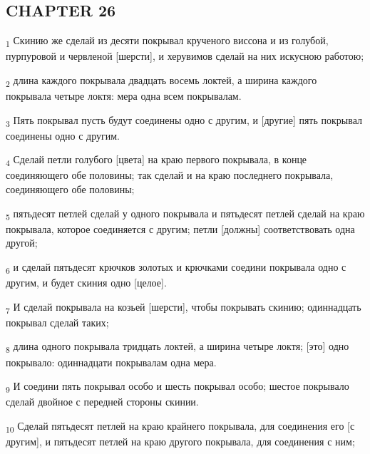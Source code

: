 \subsection{CHAPTER 26}
\begin{tcolorbox}
\textsubscript{1} Скинию же сделай из десяти покрывал крученого виссона и из голубой, пурпуровой и червленой [шерсти], и херувимов сделай на них искусною работою;
\end{tcolorbox}
\begin{tcolorbox}
\textsubscript{2} длина каждого покрывала двадцать восемь локтей, а ширина каждого покрывала четыре локтя: мера одна всем покрывалам.
\end{tcolorbox}
\begin{tcolorbox}
\textsubscript{3} Пять покрывал пусть будут соединены одно с другим, и [другие] пять покрывал соединены одно с другим.
\end{tcolorbox}
\begin{tcolorbox}
\textsubscript{4} Сделай петли голубого [цвета] на краю первого покрывала, в конце соединяющего обе половины; так сделай и на краю последнего покрывала, соединяющего обе половины;
\end{tcolorbox}
\begin{tcolorbox}
\textsubscript{5} пятьдесят петлей сделай у одного покрывала и пятьдесят петлей сделай на краю покрывала, которое соединяется с другим; петли [должны] соответствовать одна другой;
\end{tcolorbox}
\begin{tcolorbox}
\textsubscript{6} и сделай пятьдесят крючков золотых и крючками соедини покрывала одно с другим, и будет скиния одно [целое].
\end{tcolorbox}
\begin{tcolorbox}
\textsubscript{7} И сделай покрывала на козьей [шерсти], чтобы покрывать скинию; одиннадцать покрывал сделай таких;
\end{tcolorbox}
\begin{tcolorbox}
\textsubscript{8} длина одного покрывала тридцать локтей, а ширина четыре локтя; [это] одно покрывало: одиннадцати покрывалам одна мера.
\end{tcolorbox}
\begin{tcolorbox}
\textsubscript{9} И соедини пять покрывал особо и шесть покрывал особо; шестое покрывало сделай двойное с передней стороны скинии.
\end{tcolorbox}
\begin{tcolorbox}
\textsubscript{10} Сделай пятьдесят петлей на краю крайнего покрывала, для соединения его [с другим], и пятьдесят петлей на краю другого покрывала, для соединения с ним;
\end{tcolorbox}
